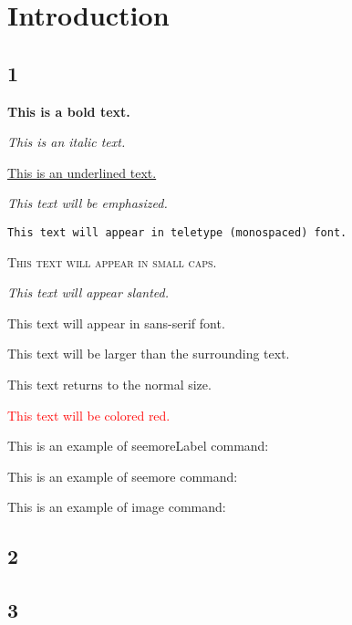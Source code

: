 \tableofcontents
\newpage
\section{Introduction}

\subsection{1}

\textbf{This is a bold text.}

\textit{This is an italic text.}

\underline{This is an underlined text.}

\emph{This text will be emphasized.}

\texttt{This text will appear in teletype (monospaced) font.}

\textsc{This text will appear in small caps.}

\textsl{This text will appear slanted.}

\textsf{This text will appear in sans-serif font.}

\Large{This text will be larger than the surrounding text.}

\normalsize{This text returns to the normal size.}

\textcolor{red}{This text will be colored red.}

\bigskip
This is an example of seemoreLabel command: 

This is an example of seemore command:


This is an example of image command:


\subsection{2}





\subsection{3}




\clearpage  %
